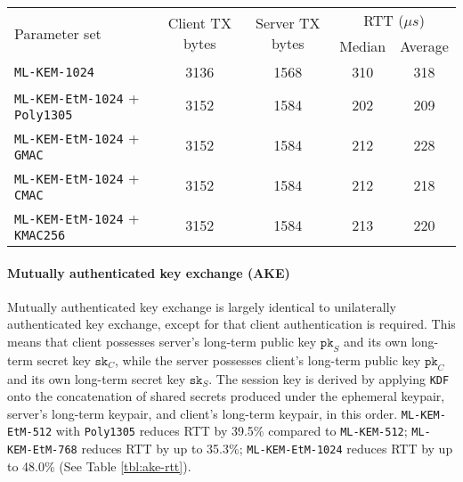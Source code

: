 \documentclass[runningheads]{llncs}
\newcommand{\pk}{\texttt{pk}}
\newcommand{\sk}{\texttt{sk}}
\newcommand{\us}{\mu s}
\begin{document}
\begin{table}[h]
    \begin{tabular}{|p{14em}|c|c|c|c|}
        \hline
        \multirow{2}{*}{Parameter set}
        & \multirow{2}{*}{Client TX bytes}
        & \multirow{2}{*}{Server TX bytes}
        & \multicolumn{2}{|c|}{RTT ($\us$)} \\
        \cline{4-5}
        & & & Median & Average \\
        \hline
        \texttt{ML-KEM-1024} & 3136 & 1568 & 310 & 318 \\
        \hline
        \texttt{ML-KEM-EtM-1024} + \texttt{Poly1305} & 3152 & 1584 & 202 & 209 \\
        \hline
        \texttt{ML-KEM-EtM-1024} + \texttt{GMAC} & 3152 & 1584 & 212 & 228 \\
        \hline
        \texttt{ML-KEM-EtM-1024} + \texttt{CMAC} & 3152 & 1584 & 212 & 218 \\
        \hline
        \texttt{ML-KEM-EtM-1024} + \texttt{KMAC256} & 3152 & 1584 & 213 & 220 \\
        \hline
    \end{tabular}
\end{table}

\paragraph{Mutually authenticated key exchange (AKE)}
Mutually authenticated key exchange is largely identical to unilaterally authenticated key exchange, except for that client authentication is required. This means that client possesses server's long-term public key $\pk_S$ and its own long-term secret key $\sk_C$, while the server possesses client's long-term public key $\pk_C$ and its own long-term secret key $\sk_S$. The session key is derived by applying \texttt{KDF} onto the concatenation of shared secrets produced under the ephemeral keypair, server's long-term keypair, and client's long-term keypair, in this order. \texttt{ML-KEM-EtM-512} with \texttt{Poly1305} reduces RTT by 39.5\% compared to \texttt{ML-KEM-512}; \texttt{ML-KEM-EtM-768} reduces RTT by up to 35.3\%; \texttt{ML-KEM-EtM-1024} reduces RTT by up to 48.0\% (See Table \ref{tbl:ake-rtt}).
\end{document}
